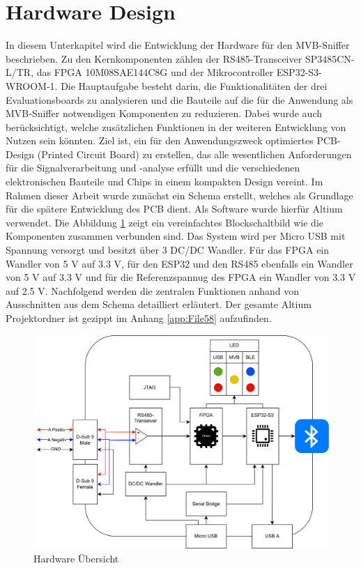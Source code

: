 
\section{Hardware Design}
\label{sec:Hardware Design}

In diesem Unterkapitel wird die Entwicklung der Hardware für den MVB-Sniffer beschrieben. Zu den Kernkomponenten zählen der RS485-Transceiver SP3485CN-L/TR, das FPGA 10M08SAE144C8G und der Mikrocontroller ESP32-S3-WROOM-1. Die Hauptaufgabe besteht darin, die Funktionalitäten der drei Evaluationsboards zu analysieren und die Bauteile auf die für die Anwendung als MVB-Sniffer notwendigen Komponenten zu reduzieren. Dabei wurde auch berücksichtigt, welche zusätzlichen Funktionen in der weiteren Entwicklung von Nutzen sein könnten. Ziel ist, ein für den Anwendungszweck optimiertes PCB-Design (Printed Circuit Board) zu erstellen, das alle wesentlichen Anforderungen für die Signalverarbeitung und -analyse erfüllt und die verschiedenen elektronischen Bauteile und Chips in einem kompakten Design vereint. Im Rahmen dieser Arbeit wurde zunächst ein Schema erstellt, welches als Grundlage für die spätere Entwicklung des PCB dient. Als Software wurde hierfür Altium verwendet. Die Abbildung \ref{fig:Hardware Übersicht} zeigt ein vereinfachtes Blockschaltbild wie die Komponenten zusammen verbunden sind. Das System wird per Micro USB mit Spannung versorgt und besitzt über 3 DC/DC Wandler. Für das FPGA  ein Wandler von 5 V auf 3.3 V, für den ESP32 und den RS485 ebenfalls ein Wandler von 5 V auf 3.3 V und für die Referenzspannug des FPGA ein Wandler von 3.3 V auf 2.5 V. Nachfolgend werden die zentralen Funktionen anhand von Ausschnitten aus dem Schema detailliert erläutert. Der gesamte Altium Projektordner ist gezippt im Anhang \ref{app:File58} aufzufinden.

\begin{figure}[H]
    \centering
    \includegraphics[width=0.8\linewidth]{Figures/Chap3/Schematics/Aufbau_Hardware_Sniffer.drawio.png}
    \caption{Hardware Übersicht}
    \label{fig:Hardware Übersicht}
\end{figure}


